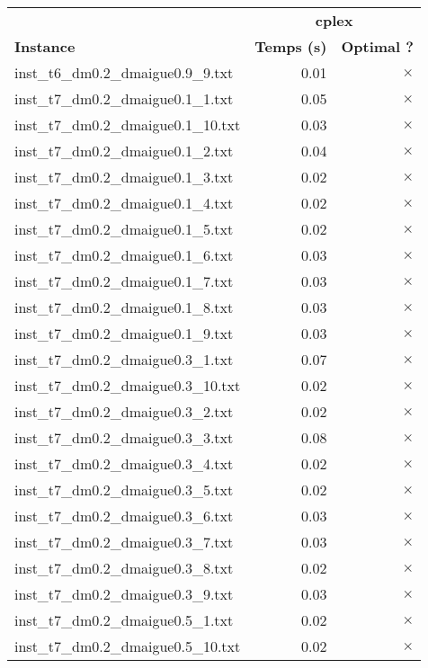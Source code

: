 \documentclass{article}
\begin{document}
\newpage
\begin{center}
\renewcommand{\arraystretch}{1.4} 
 \begin{tabular}{lrr}
	\hline
 & \multicolumn{2}{c}{\textbf{cplex}}\\
\textbf{Instance}  & \textbf{Temps (s)} & \textbf{Optimal ?} \\\hline

inst\_t6\_dm0.2\_dmaigue0.9\_9.txt & 0.01 & 
$\times$
\\
inst\_t7\_dm0.2\_dmaigue0.1\_1.txt & 0.05 & 
$\times$
\\
inst\_t7\_dm0.2\_dmaigue0.1\_10.txt & 0.03 & 
$\times$
\\
inst\_t7\_dm0.2\_dmaigue0.1\_2.txt & 0.04 & 
$\times$
\\
inst\_t7\_dm0.2\_dmaigue0.1\_3.txt & 0.02 & 
$\times$
\\
inst\_t7\_dm0.2\_dmaigue0.1\_4.txt & 0.02 & 
$\times$
\\
inst\_t7\_dm0.2\_dmaigue0.1\_5.txt & 0.02 & 
$\times$
\\
inst\_t7\_dm0.2\_dmaigue0.1\_6.txt & 0.03 & 
$\times$
\\
inst\_t7\_dm0.2\_dmaigue0.1\_7.txt & 0.03 & 
$\times$
\\
inst\_t7\_dm0.2\_dmaigue0.1\_8.txt & 0.03 & 
$\times$
\\
inst\_t7\_dm0.2\_dmaigue0.1\_9.txt & 0.03 & 
$\times$
\\
inst\_t7\_dm0.2\_dmaigue0.3\_1.txt & 0.07 & 
$\times$
\\
inst\_t7\_dm0.2\_dmaigue0.3\_10.txt & 0.02 & 
$\times$
\\
inst\_t7\_dm0.2\_dmaigue0.3\_2.txt & 0.02 & 
$\times$
\\
inst\_t7\_dm0.2\_dmaigue0.3\_3.txt & 0.08 & 
$\times$
\\
inst\_t7\_dm0.2\_dmaigue0.3\_4.txt & 0.02 & 
$\times$
\\
inst\_t7\_dm0.2\_dmaigue0.3\_5.txt & 0.02 & 
$\times$
\\
inst\_t7\_dm0.2\_dmaigue0.3\_6.txt & 0.03 & 
$\times$
\\
inst\_t7\_dm0.2\_dmaigue0.3\_7.txt & 0.03 & 
$\times$
\\
inst\_t7\_dm0.2\_dmaigue0.3\_8.txt & 0.02 & 
$\times$
\\
inst\_t7\_dm0.2\_dmaigue0.3\_9.txt & 0.03 & 
$\times$
\\
inst\_t7\_dm0.2\_dmaigue0.5\_1.txt & 0.02 & 
$\times$
\\
inst\_t7\_dm0.2\_dmaigue0.5\_10.txt & 0.02 & 
$\times$
\\

\end{tabular}
\end{center}
\end{document}
